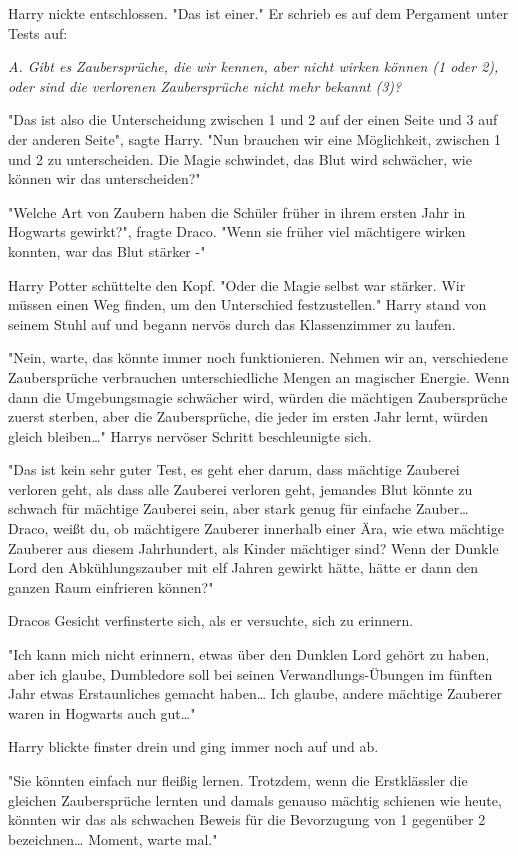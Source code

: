 {Harry nickte entschlossen. "Das ist einer." Er schrieb es auf dem Pergament unter Tests auf:

\emph{A. Gibt es Zaubersprüche, die wir kennen, aber nicht wirken können (1 oder 2), oder sind die verlorenen Zaubersprüche nicht mehr bekannt (3)?}

"Das ist also die Unterscheidung zwischen 1 und 2 auf der einen Seite und 3 auf der anderen Seite", sagte Harry. "Nun brauchen wir eine Möglichkeit, zwischen 1 und 2 zu unterscheiden. Die Magie schwindet, das Blut wird schwächer, wie können wir das unterscheiden?"

"Welche Art von Zaubern haben die Schüler früher in ihrem ersten Jahr in Hogwarts gewirkt?", fragte Draco. "Wenn sie früher viel mächtigere wirken konnten, war das Blut stärker -"

Harry Potter schüttelte den Kopf. "Oder die Magie selbst war stärker. Wir müssen einen Weg finden, um den Unterschied festzustellen." Harry stand von seinem Stuhl auf und begann nervös durch das Klassenzimmer zu laufen.

"Nein, warte, das könnte immer noch funktionieren. Nehmen wir an, verschiedene Zaubersprüche verbrauchen unterschiedliche Mengen an magischer Energie. Wenn dann die Umgebungsmagie schwächer wird, würden die mächtigen Zaubersprüche zuerst sterben, aber die Zaubersprüche, die jeder im ersten Jahr lernt, würden gleich bleiben…" Harrys nervöser Schritt beschleunigte sich.

"Das ist kein sehr guter Test, es geht eher darum, dass mächtige Zauberei verloren geht, als dass alle Zauberei verloren geht, jemandes Blut könnte zu schwach für mächtige Zauberei sein, aber stark genug für einfache Zauber… Draco, weißt du, ob mächtigere Zauberer innerhalb einer Ära, wie etwa mächtige Zauberer aus diesem Jahrhundert, als Kinder mächtiger sind? Wenn der Dunkle Lord den Abkühlungszauber mit elf Jahren gewirkt hätte, hätte er dann den ganzen Raum einfrieren können?"

Dracos Gesicht verfinsterte sich, als er versuchte, sich zu erinnern.

"Ich kann mich nicht erinnern, etwas über den Dunklen Lord gehört zu haben, aber ich glaube, Dumbledore soll bei seinen Verwandlungs-Übungen im fünften Jahr etwas Erstaunliches gemacht haben… Ich glaube, andere mächtige Zauberer waren in Hogwarts auch gut…"

Harry blickte finster drein und ging immer noch auf und ab.

"Sie könnten einfach nur fleißig lernen. Trotzdem, wenn die Erstklässler die gleichen Zaubersprüche lernten und damals genauso mächtig schienen wie heute, könnten wir das als schwachen Beweis für die Bevorzugung von 1 gegenüber 2 bezeichnen… Moment, warte mal."

}
